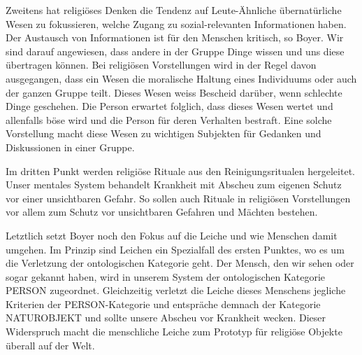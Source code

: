 Zweitens hat religiöses Denken die Tendenz auf Leute-Ähnliche übernatürliche Wesen zu fokussieren, welche Zugang zu sozial-relevanten Informationen haben. Der Austausch von Informationen ist für den Menschen kritisch, so Boyer. Wir sind darauf angewiesen, dass andere in der Gruppe Dinge wissen und uns diese übertragen können. Bei religiösen Vorstellungen wird in der Regel davon ausgegangen, dass ein Wesen die moralische Haltung eines Individuums oder auch der ganzen Gruppe teilt. Dieses Wesen weiss Bescheid darüber, wenn schlechte Dinge geschehen. Die Person erwartet folglich, dass dieses Wesen wertet und allenfalls böse wird und die Person für deren Verhalten bestraft. Eine solche Vorstellung macht diese Wesen zu wichtigen Subjekten für Gedanken und Diskussionen in einer Gruppe. 

Im dritten Punkt werden religiöse Rituale aus den Reinigungsritualen hergeleitet. Unser mentales System behandelt Krankheit mit Abscheu zum eigenen Schutz vor einer unsichtbaren Gefahr. So sollen auch Rituale in religiösen Vorstellungen vor allem zum Schutz vor unsichtbaren Gefahren und Mächten bestehen. 

Letztlich setzt Boyer noch den Fokus auf die Leiche und wie Menschen damit umgehen. Im Prinzip sind Leichen ein Spezialfall des ersten Punktes, wo es um die Verletzung der ontologischen Kategorie geht. Der Mensch, den wir sehen oder sogar gekannt haben, wird in unserem System der ontologischen Kategorie PERSON zugeordnet. Gleichzeitig verletzt die Leiche dieses Menschens jegliche Kriterien der PERSON-Kategorie und entspräche demnach der Kategorie NATUROBJEKT und sollte unsere Abscheu vor Krankheit wecken. Dieser Widerspruch macht die menschliche Leiche zum Prototyp für religiöse Objekte überall auf der Welt.
